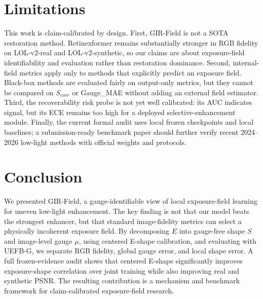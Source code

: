 \section{Limitations}
\label{sec:limitations}

This work is claim-calibrated by design. First, GIR-Field is not a SOTA restoration method. Retinexformer remains substantially stronger in RGB fidelity on LOL-v2-real and LOL-v2-synthetic, so our claims are about exposure-field identifiability and evaluation rather than restoration dominance. Second, internal-field metrics apply only to methods that explicitly predict an exposure field. Black-box methods are evaluated fairly on output-only metrics, but they cannot be compared on $S_{corr}$ or Gauge\_MAE without adding an external field estimator. Third, the recoverability risk probe is not yet well calibrated: its AUC indicates signal, but its ECE remains too high for a deployed selective-enhancement module. Finally, the current formal audit uses local frozen checkpoints and local baselines; a submission-ready benchmark paper should further verify recent 2024--2026 low-light methods with official weights and protocols.

\section{Conclusion}
\label{sec:conclusion}

We presented GIR-Field, a gauge-identifiable view of local exposure-field learning for uneven low-light enhancement. The key finding is not that our model beats the strongest enhancer, but that standard image-fidelity metrics can select a physically incoherent exposure field. By decomposing $E$ into gauge-free shape $S$ and image-level gauge $\mu$, using centered E-shape calibration, and evaluating with UEFB-G, we separate RGB fidelity, global gauge error, and local shape error. A full frozen-evidence audit shows that centered E-shape significantly improves exposure-shape correlation over joint training while also improving real and synthetic PSNR. The resulting contribution is a mechanism and benchmark framework for claim-calibrated exposure-field research.
